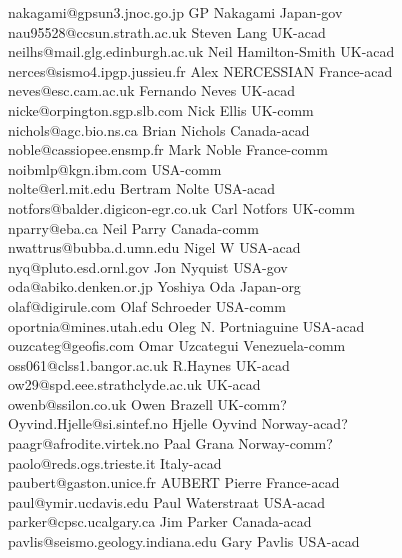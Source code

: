 \begin{tabbing}
nakagami@gpsun3.jnoc.go.jp \> GP Nakagami \> Japan-gov\\
nau95528@ccsun.strath.ac.uk \> Steven Lang \> UK-acad\\
neilhs@mail.glg.edinburgh.ac.uk \> Neil Hamilton-Smith \> UK-acad\\
nerces@sismo4.ipgp.jussieu.fr \> Alex NERCESSIAN \> France-acad\\
neves@esc.cam.ac.uk \> Fernando Neves \> UK-acad\\
nicke@orpington.sgp.slb.com \> Nick Ellis \>  UK-comm\\
nichols@agc.bio.ns.ca \> Brian Nichols \> Canada-acad\\
noble@cassiopee.ensmp.fr \> Mark Noble \> France-comm\\
noibmlp@kgn.ibm.com \> \> USA-comm\\
nolte@erl.mit.edu \> Bertram Nolte \> USA-acad\\
notfors@balder.digicon-egr.co.uk \> Carl Notfors \> UK-comm\\
nparry@eba.ca \> Neil Parry \> Canada-comm\\
nwattrus@bubba.d.umn.edu \> Nigel W \> USA-acad\\
nyq@pluto.esd.ornl.gov \>  Jon Nyquist \> USA-gov\\
oda@abiko.denken.or.jp \> Yoshiya Oda \> Japan-org\\
olaf@digirule.com \> Olaf Schroeder \> USA-comm\\
oportnia@mines.utah.edu \> Oleg N. Portniaguine \> USA-acad\\
ouzcateg@geofis.com \> Omar Uzcategui \> Venezuela-comm\\
oss061@clss1.bangor.ac.uk \> R.Haynes \> UK-acad\\
ow29@spd.eee.strathclyde.ac.uk \> \> UK-acad\\
owenb@ssilon.co.uk \> Owen Brazell \> UK-comm?\\
Oyvind.Hjelle@si.sintef.no \> Hjelle Oyvind \> Norway-acad?\\
paagr@afrodite.virtek.no \> Paal Grana \> Norway-comm?\\
paolo@reds.ogs.trieste.it \> \> Italy-acad\\
paubert@gaston.unice.fr \> AUBERT Pierre \> France-acad\\
paul@ymir.ucdavis.edu \> Paul Waterstraat \> USA-acad\\
parker@cpsc.ucalgary.ca \> Jim Parker \> Canada-acad\\
pavlis@seismo.geology.indiana.edu \> Gary Pavlis \> USA-acad\\

\end{tabbing}
